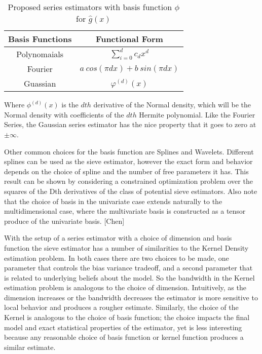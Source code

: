 \documentclass[12pt]{article}  %
\begin{document}
\begin{table}[h]
\label{tab:basis}
\begin{center}
\begin{tabular}{|c|c|}
\hline
Basis Functions & Functional Form\\
\hline
Polynomaials & $\sum_{i=0}^{d} c_d x^d$\\
Fourier &$a~cos(\pi d x) + b~sin(\pi d x)$\\
Guassian &$\varphi^{(d)}(x)$\\
\hline
\end{tabular}
\caption {Proposed series estimators with basis function $\phi$ for $\hat{g}(x)$ }
\end{center}
\end{table}


Where $\phi^{(d)}(x)$ is the $dth$ derivative of the Normal density, which will be the Normal density with coefficients  of the $dth$ Hermite polynomial. Like the Fourier Series, the Gaussian series estimator has the nice property that it goes to zero at $\pm \infty$.


Other common choices for the basis function are Splines and Wavelets.  Different splines can be used as the sieve estimator, however the exact form and behavior depends on the choice of spline and the number of free parameters it has.  This result can be shown by considering a constrained optimization problem over the squares of the Dth derivatives of the class of potential sieve estimators. Also note that the choice of basis in the univariate case extends naturally to the multidimensional case, where the multivariate basis is constructed as a tensor produce of the univariate basis. [Chen]

With the setup of a series estimator with a choice of dimension and basis function the sieve estimator has a number of similarities to the Kernel Density estimation problem.  In both cases there are two choices to be made, one parameter that controls the bias variance tradeoff, and a second parameter that is related to underlying beliefs about the model.  So the bandwidth in the Kernel estimation problem is analogous to the choice of dimension. Intuitively, as the dimension increases or the bandwidth decreases the estimator is more sensitive to local behavior and produces a rougher estimate. Similarly, the choice of the Kernel is analogous to the choice of basis function; the choice impacts the final model and exact statistical properties of the estimator, yet is less interesting because any reasonable choice of basis function or kernel function produces a similar estimate. 
\end{document}

